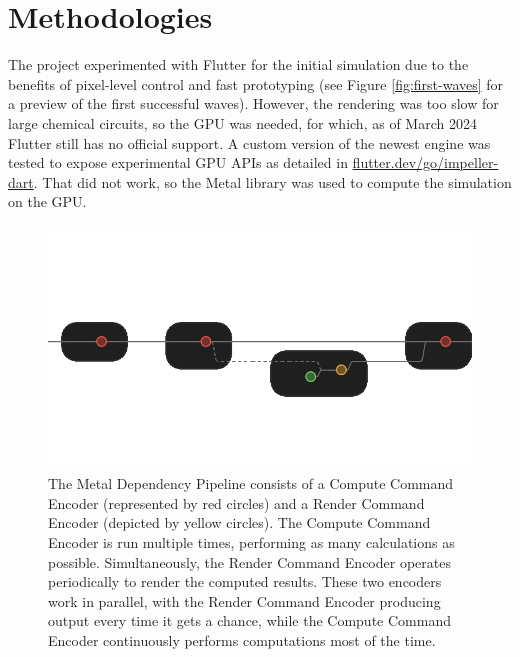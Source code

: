 \chapter{Methodologies}
The project experimented with Flutter for the initial simulation due to the benefits of pixel-level control and fast prototyping (see Figure \ref{fig:first-waves} for a preview of the first successful waves). However, the rendering was too slow for large chemical circuits, so the GPU was needed, for which, as of March 2024 Flutter still has no official support. A custom version of the newest engine was tested to expose experimental GPU APIs as detailed in \href{flutter.dev/go/impeller-dart}{flutter.dev/go/impeller-dart}.
That did not work, so the Metal library was used to compute the simulation on the GPU. 
\begin{figure}
    \centering
    \includegraphics[width=0.5\linewidth]{metal-pipeline.png}
    \caption{The Metal Dependency Pipeline consists of a Compute Command Encoder (represented by red circles) and a Render Command Encoder (depicted by yellow circles). The Compute Command Encoder is run multiple times, performing as many calculations as possible. Simultaneously, the Render Command Encoder operates periodically to render the computed results. These two encoders work in parallel, with the Render Command Encoder producing output every time it gets a chance, while the Compute Command Encoder continuously performs computations most of the time.}
    \label{fig:metal-dependency-pipline}
\end{figure}

